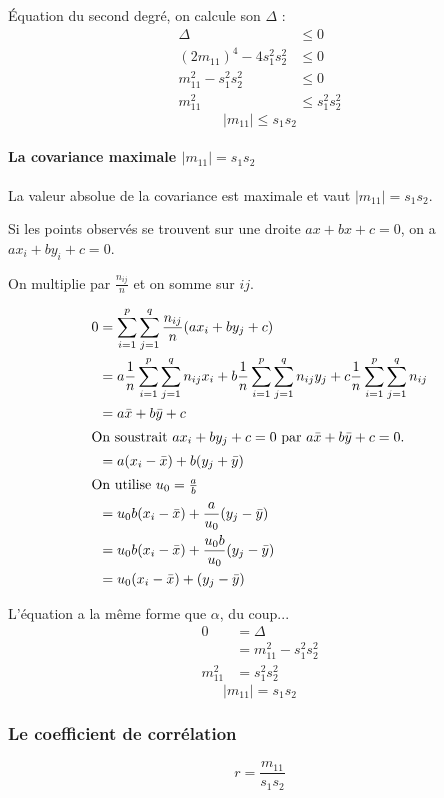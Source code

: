 Équation du second degré, on calcule son $\Delta$ :
\begin{align*}
	\Delta &\leq 0\\
	(2 m_{11})^4 - 4 s_1^2 s_2^2 &\leq 0\\
	m_{11}^2 - s_1^2 s_2^2 &\leq 0\\
	m_{11}^2 &\leq s_1^2 s_2^2
\end{align*}
$$\boxed{|m_{11}| \leq s_1 s_2}$$




\paragraph{La covariance maximale $|m_{11}| = s_1s_2$}

La valeur absolue de la covariance est maximale et vaut $|m_{11}| = s_1s_2$.

Si les points observés se trouvent sur une droite $ax+bx+c=0$, on a $ax_i+by_i+c=0$.

On multiplie par $\frac{n_{ij}}{n}$ et on somme sur $ij$.

\begin{align*}
0  &= \sum_{i=1}^{p} \sum_{j=1}^{q} \frac{n_{ij}}{n}(ax_i+by_j+c) \\
   &= a \frac{1}{n} \sum_{i=1}^{p} \sum_{j=1}^{q}n_{ij}x_i + b \frac{1}{n} \sum_{i=1}^{p} \sum_{j=1}^{q}n_{ij}y_j + c \frac{1}{n} \sum_{i=1}^{p} \sum_{j=1}^{q}n_{ij}\\
   &= a\bar{x}+b\bar{y}+c\\
\intertext{On soustrait $ax_i+by_j+c=0$ par $a\bar{x}+b\bar{y}+c = 0$.}
   &= a(x_i-\bar{x})+b(y_j+\bar{y})\\
\intertext{On utilise $u_0=\frac{a}{b}$}
   &= u_0b(x_i-\bar{x})+\frac{a}{u_0}(y_j-\bar{y})\\
   &= u_0b(x_i-\bar{x})+\frac{u_0b}{u_0}(y_j-\bar{y})\\
   &= u_0(x_i-\bar{x})+(y_j-\bar{y})
\end{align*}

L'équation a la même forme que $\alpha$, du coup...
\begin{align*}
	0        &= \Delta\\
	         &= m_{11}^2-s_1^2s_2^2\\
	m_{11}^2 &= s_1^2s_2^2
\end{align*}
$$\boxed{|m_{11}| = s_1s_2}$$




\subsubsection{Le coefficient de corrélation}
$$\boxed{r=\frac{m_{11}}{s_1s_2}}$$

